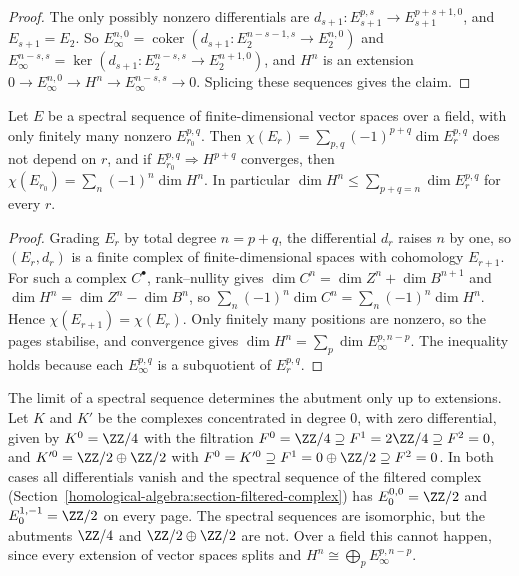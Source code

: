 \begin{proof}
The only possibly nonzero differentials are $d_{s+1} \colon E_{s+1}^{p,s} \to E_{s+1}^{p+s+1,0}$, and $E_{s+1} = E_2$. So
$E_\infty^{n,0} = \operatorname{coker}(d_{s+1} \colon E_2^{n-s-1,s} \to E_2^{n,0})$ and $E_\infty^{n-s,s} = \ker(d_{s+1} \colon E_2^{n-s,s} \to E_2^{n+1,0})$, and $H^n$ is
an extension $0 \to E_\infty^{n,0} \to H^n \to E_\infty^{n-s,s} \to 0$. Splicing these sequences gives the claim.
\end{proof}

\begin{proposition}\label{homological-algebra:proposition-euler-characteristic}
Let $E$ be a spectral sequence of finite-dimensional vector spaces over a field, with only finitely many nonzero $E_{r_0}^{p,q}$. Then $\chi(E_r) = \sum_{p,q}(-1)^{p+q}\dim E_r^{p,q}$ does not depend on $r$, and if
$E_{r_0}^{p,q} \Rightarrow H^{p+q}$ converges, then $\chi(E_{r_0}) = \sum_n(-1)^n\dim H^n$. In particular $\dim H^n \leq \sum_{p+q=n}\dim E_r^{p,q}$ for every $r$.
\end{proposition}

\begin{proof}
Grading $E_r$ by total degree $n = p + q$, the differential $d_r$ raises $n$ by one, so $(E_r, d_r)$ is a finite complex of finite-dimensional spaces with cohomology $E_{r+1}$. For such a complex
$C^\bullet$, rank--nullity gives $\dim C^n = \dim Z^n + \dim B^{n+1}$ and $\dim H^n = \dim Z^n - \dim B^n$, so $\sum_n(-1)^n\dim C^n = \sum_n(-1)^n\dim H^n$. Hence $\chi(E_{r+1}) = \chi(E_r)$. Only finitely many
positions are nonzero, so the pages stabilise, and convergence gives $\dim H^n = \sum_p\dim E_\infty^{p,n-p}$. The inequality holds because each $E_\infty^{p,q}$ is a subquotient of $E_r^{p,q}$.
\end{proof}

\begin{counterexample}\label{homological-algebra:counterexample-extension}
The limit of a spectral sequence determines the abutment only up to extensions. Let $K$ and $K'$ be the complexes concentrated in degree $0$, with zero differential, given by $K^0 = \ZZ/4$ with the filtration
$F^0 = \ZZ/4 \supseteq F^1 = 2\ZZ/4 \supseteq F^2 = 0$, and $K'^0 = \ZZ/2 \oplus \ZZ/2$ with $F^0 = K'^0 \supseteq F^1 = 0 \oplus \ZZ/2 \supseteq F^2 = 0$. In both cases all differentials vanish and the spectral
sequence of the filtered complex (Section~\ref{homological-algebra:section-filtered-complex}) has $E_0^{0,0} = \ZZ/2$ and $E_0^{1,-1} = \ZZ/2$ on every page. The spectral sequences are isomorphic, but the abutments
$\ZZ/4$ and $\ZZ/2 \oplus \ZZ/2$ are not. Over a field this cannot happen, since every extension of vector spaces splits and $H^n \cong \bigoplus_pE_\infty^{p,n-p}$.
\end{counterexample}


